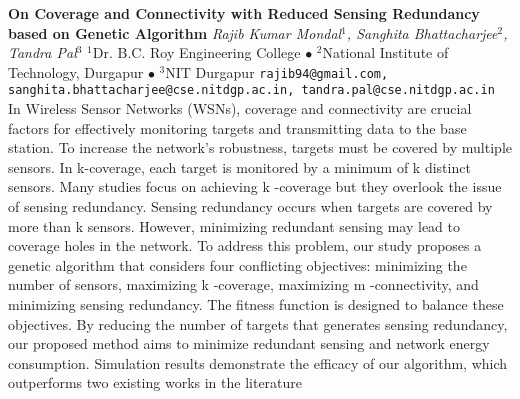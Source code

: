 
    \begin{conf-abstract}[]
        {\textbf{On Coverage and Connectivity with Reduced Sensing Redundancy based on Genetic Algorithm}}
        {\textit{Rajib  Kumar Mondal$^{1}$, Sanghita Bhattacharjee$^{2}$, Tandra Pal$^{3}$}}
        {$^{1}$Dr. B.C. Roy Engineering College $\bullet$ $^{2}$National Institute of Technology, Durgapur $\bullet$ $^{3}$NIT Durgapur}
        {\texttt{rajib94@gmail.com, sanghita.bhattacharjee@cse.nitdgp.ac.in, tandra.pal@cse.nitdgp.ac.in}}
        {In Wireless Sensor Networks (WSNs), coverage and connectivity are crucial factors for effectively monitoring targets and transmitting data to the base station. To increase the network's robustness, targets must be covered by multiple sensors. In k-coverage, each target is monitored by a minimum of k distinct sensors. Many studies focus on achieving k -coverage but they overlook the issue of sensing redundancy. Sensing redundancy occurs when targets are covered by more than k sensors. However, minimizing redundant sensing may lead to coverage holes in the network. To address this problem, our study proposes a genetic algorithm that considers four conflicting objectives: minimizing the number of sensors, maximizing k -coverage, maximizing m -connectivity, and minimizing sensing redundancy. The fitness function is designed to balance these objectives. By reducing the number of targets that generates sensing redundancy, our proposed method aims to minimize redundant sensing and network energy consumption. Simulation results demonstrate the efficacy of our algorithm, which outperforms two existing works in the literature}
    \end{conf-abstract}
        